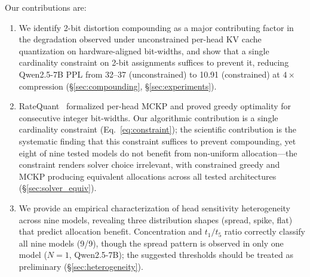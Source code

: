 Our contributions are:
\begin{enumerate}[nosep]
\item We identify 2-bit distortion compounding as a major contributing factor in the degradation observed under unconstrained per-head KV cache quantization on hardware-aligned bit-widths, and show that a single cardinality constraint on 2-bit assignments suffices to prevent it, reducing Qwen2.5-7B PPL from 32--37 (unconstrained) to 10.91 (constrained) at $4\times$ compression (\S\ref{sec:compounding}, \S\ref{sec:experiments}).

\item RateQuant~\cite{zuo2026ratequant} formalized per-head MCKP and proved greedy optimality for consecutive integer bit-widths. Our algorithmic contribution is a single cardinality constraint (Eq.~\ref{eq:constraint}); the scientific contribution is the systematic finding that this constraint suffices to prevent compounding, yet eight of nine tested models do not benefit from non-uniform allocation---the constraint renders solver choice irrelevant, with constrained greedy and MCKP producing equivalent allocations across all tested architectures (\S\ref{sec:solver_equiv}).

\item We provide an empirical characterization of head sensitivity heterogeneity across nine models, revealing three distribution shapes (spread, spike, flat) that predict allocation benefit. Concentration and $t_1/t_5$ ratio correctly classify all nine models (9/9), though the spread pattern is observed in only one model ($N{=}1$, Qwen2.5-7B); the suggested thresholds should be treated as preliminary (\S\ref{sec:heterogeneity}).
\end{enumerate}
